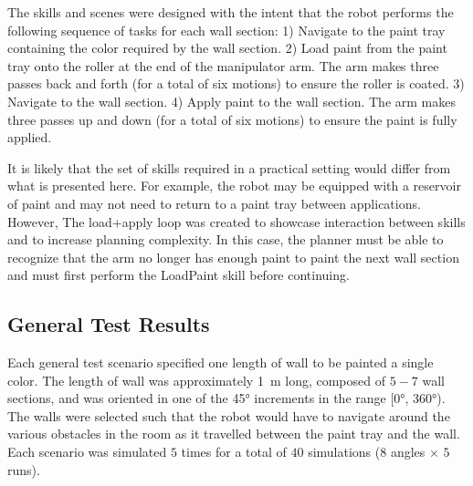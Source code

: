 The skills and scenes were designed with the intent that the robot performs the following sequence of tasks for each wall section: 1) Navigate to the paint tray containing the color required by the wall section. 2) Load paint from the paint tray onto the roller at the end of the manipulator arm. The arm makes three passes back and forth (for a total of six motions) to ensure the roller is coated. 3) Navigate to the wall section. 4) Apply paint to the wall section. The arm makes three passes up and down (for a total of six motions) to ensure the paint is fully applied.

It is likely that the set of skills required in a practical setting would differ from what is presented here. For example, the robot may be equipped with a reservoir of paint and may not need to return to a paint tray between applications. However, The load+apply loop was created to showcase interaction between skills and to increase planning complexity. In this case, the planner must be able to recognize that the arm no longer has enough paint to paint the next wall section and must first perform the LoadPaint skill before continuing.

\subsection{General Test Results}
Each general test scenario specified one length of wall to be painted a single color. The length of wall was approximately \SI{1}{\meter} long, composed of $5-7$ wall sections, and was oriented in one of the \ang{45} increments in the range [\ang{0}, \ang{360}). The walls were selected such that the robot would have to navigate around the various obstacles in the room as it travelled between the paint tray and the wall. Each scenario was simulated $5$ times for a total of $40$ simulations ($8$ angles $\times$ $5$ runs).

